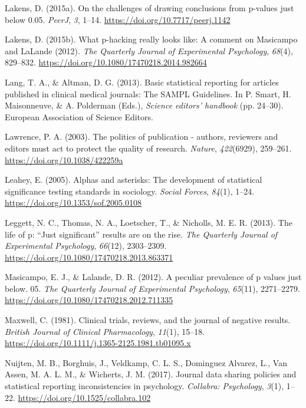 \documentclass[
  12pt,
]{article}
\begin{document}
\leavevmode\hypertarget{ref-Lakens2015a}{}%
Lakens, D. (2015a). On the challenges of drawing conclusions from
p-values just below 0.05. \emph{PeerJ}, \emph{3}, 1--14.
\url{https://doi.org/10.7717/peerj.1142}

\leavevmode\hypertarget{ref-Lakens2015b}{}%
Lakens, D. (2015b). What p-hacking really looks like: A comment on
Masicampo and LaLande (2012). \emph{The Quarterly Journal of
Experimental Psychology}, \emph{68}(4), 829--832.
\url{https://doi.org/10.1080/17470218.2014.982664}

\leavevmode\hypertarget{ref-Lang}{}%
Lang, T. A., \& Altman, D. G. (2013). Basic statistical reporting for
articles published in clinical medical journals: The SAMPL Guidelines.
In P. Smart, H. Maisonneuve, \& A. Polderman (Eds.), \emph{Science
editors' handbook} (pp. 24--30). European Association of Science
Editors.

\leavevmode\hypertarget{ref-Lawrence}{}%
Lawrence, P. A. (2003). The politics of publication - authors, reviewers
and editors must act to protect the quality of research. \emph{Nature},
\emph{422}(6929), 259--261. \url{https://doi.org/10.1038/422259a}

\leavevmode\hypertarget{ref-Leahey}{}%
Leahey, E. (2005). Alphas and asterisks: The development of statistical
significance testing standards in sociology. \emph{Social Forces},
\emph{84}(1), 1--24. \url{https://doi.org/10.1353/sof.2005.0108}

\leavevmode\hypertarget{ref-Leggett}{}%
Leggett, N. C., Thomas, N. A., Loetscher, T., \& Nicholls, M. E. R.
(2013). The life of p: ``Just significant'' results are on the rise.
\emph{The Quarterly Journal of Experimental Psychology}, \emph{66}(12),
2303--2309. \url{https://doi.org/10.1080/17470218.2013.863371}

\leavevmode\hypertarget{ref-Masicampo}{}%
Masicampo, E. J., \& Lalande, D. R. (2012). A peculiar prevalence of p
values just below. 05. \emph{The Quarterly Journal of Experimental
Psychology}, \emph{65}(11), 2271--2279.
\url{https://doi.org/10.1080/17470218.2012.711335}

\leavevmode\hypertarget{ref-Maxwell}{}%
Maxwell, C. (1981). Clinical trials, reviews, and the journal of
negative results. \emph{British Journal of Clinical Pharmacology},
\emph{11}(1), 15--18.
\url{https://doi.org/10.1111/j.1365-2125.1981.tb01095.x}

\leavevmode\hypertarget{ref-Nuijten2017}{}%
Nuijten, M. B., Borghuis, J., Veldkamp, C. L. S., Dominguez Alvarez, L.,
Van Assen, M. A. L. M., \& Wicherts, J. M. (2017). Journal data sharing
policies and statistical reporting inconsistencies in psychology.
\emph{Collabra: Psychology}, \emph{3}(1), 1--22.
\url{https://doi.org/10.1525/collabra.102}
\end{document}
